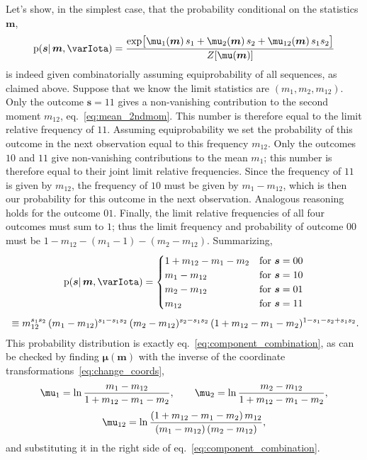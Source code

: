\documentclass[\ifafour a4paper,12pt,\else a5paper,10pt,\fi%
onecolumn,oneside,article,%
british%
]{memoir}
\theoremstyle{remark}
\theoremstyle{innote}
\newcommand*{\pf}{\mathrm{p}}%
\renewcommand*{\|}{\mathpunct{|}}
\newcommand*{\eqn}{eq.}%
\newcommand*{\yI}{\varIota}
\newcommand*{\ys}{\bm{s}}
\newcommand*{\yso}[1]{\ys^{(#1)}}
\newcommand*{\la}{\mu_{12}}
\newcommand*{\yth}{\bm{\mu}}
\newcommand*{\yt}{\bm{m}}
\newcommand*{\yl}{m_{12}}
\begin{document}
Let's show, in the simplest case, that the probability conditional on
the statistics $\yt$,
\begin{equation}
  \label{eq:component_combination}
  \pf(\ys \|\yt, \yI )
  =
  \frac{  \exp\bigl[
    \mu_1(\yt)\, s_1 + \mu_2(\yt)\, s_2 + \la(\yt)\, s_1 s_2
    \bigr] }{Z[\yth(\yt)]}
\end{equation}
is indeed given combinatorially assuming equiprobability of all sequences,
as claimed above. Suppose that we know the limit statistics are
$(m_1, m_2, \yl)$. Only the outcome $\ys=11$ gives a non-vanishing
contribution to the second moment $\yl$, \eqn~\eqref{eq:mean_2ndmom}. This
number is therefore equal to the limit relative frequency of $11$. Assuming
equiprobability we set the probability of this outcome in the next
observation equal to this frequency $\yl$. Only the outcomes $10$ and $11$
give non-vanishing contributions to the mean $m_1$; this number is
therefore equal to their joint limit relative frequencies. Since the
frequency of $11$ is given by $\yl$, the frequency of $10$ must be given by
$m_1-\yl$, which is then our probability for this outcome in the next
observation. Analogous reasoning holds for the outcome $01$. Finally, the
limit relative frequencies of all four outcomes must sum to $1$; thus the
limit frequency and probability of outcome $00$ must be
$1-\yl-(m_1-1)-(m_2-\yl)$. Summarizing,
\begin{multline}
  \label{eq:prob_outcome_from_statistics}
  \pf(\ys \| \yt,\yI) =
  \begin{cases}
    1+\yl-m_1-m_2 &\text{for } \ys=00\\
    m_1-\yl &\text{for } \ys=10\\
    m_2-\yl &\text{for } \ys=01\\
    \yl &\text{for } \ys=11
  \end{cases}
  \\[\jot]
  {}\equiv
    \yl^{s_1 s_2}\,
  (m_1-\yl)^{s_1-s_1 s_2}\,
  (m_2-\yl)^{s_2-s_1 s_2}\,
  (1+\yl-m_1-m_2)^{1-s_1-s_2+s_1 s_2}.
\end{multline}
This probability distribution is exactly
\eqn~\eqref{eq:component_combination}, as can be checked by finding
$\yth(\yt)$ with the inverse of the coordinate
transformations~\eqref{eq:change_coords},
\begin{equation}
  \label{eq:inverse_tranf_coord}
  \begin{gathered}
    \mu_1 =\ln\frac{m_1-\yl}{1+\yl-m_1-m_2},\qquad
    \mu_2 =\ln\frac{m_2-\yl}{1+\yl-m_1-m_2},\\[\jot]
\la =\ln\frac{(1+\yl-m_1-m_2)\,\yl}{(m_1-\yl)\,(m_2-\yl)},
\end{gathered}
\end{equation}
and substituting it in the right side of
\eqn~\eqref{eq:component_combination}.
\end{document}
